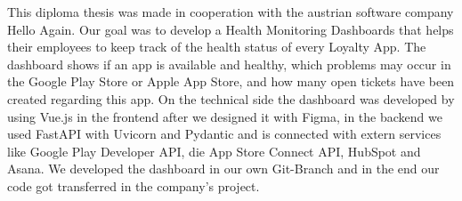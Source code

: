 
This diploma thesis was made in cooperation with the austrian software company Hello Again.
Our goal was to develop a Health Monitoring Dashboards that helps their employees to keep track of the health status of every Loyalty App.
The dashboard shows if an app is available and healthy, which problems may occur in the Google Play Store or Apple App Store, and how many open tickets have been created regarding this app.
On the technical side the dashboard was developed by using Vue.js in the frontend after we designed it with Figma, in the backend we used FastAPI with Uvicorn and Pydantic and is connected with extern services like Google Play Developer API, die App Store Connect API, HubSpot and Asana.
We developed the dashboard in our own Git-Branch and in the end our code got transferred in the company's project.
